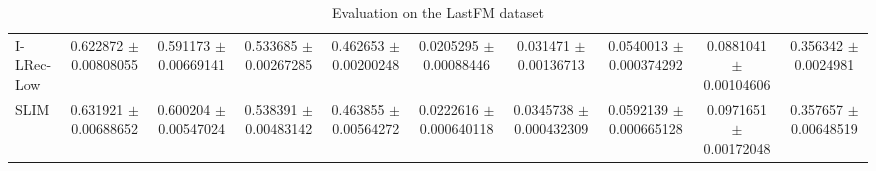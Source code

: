 \begin{table*}
{\begin{tabular}{l|cccc|cccc|c}
		I-LRec-Low & \num{0.622872} $\pm$ \num{0.00808055}&\num{0.591173} $\pm$ \num{0.00669141}&\num{0.533685} $\pm$ \num{0.00267285}&\num{0.462653} $\pm$ \num{0.00200248}&\num{0.0205295} $\pm$ \num{0.00088446}&\num{0.031471} $\pm$ \num{0.00136713}&\num{0.0540013} $\pm$ \num{0.000374292}&\num{0.0881041} $\pm$ \num{0.00104606}&\num{0.356342} $\pm$ \num{0.0024981} \\

		SLIM & \num{0.631921} $\pm$ \num{0.00688652}&\num{0.600204} $\pm$ \num{0.00547024}&\num{0.538391} $\pm$ \num{0.00483142}&\num{0.463855} $\pm$ \num{0.00564272}&\num{0.0222616} $\pm$ \num{0.000640118}&\num{0.0345738} $\pm$ \num{0.000432309}&\num{0.0592139} $\pm$ \num{0.000665128}&\num{0.0971651} $\pm$ \num{0.00172048}&\num{0.357657} $\pm$ \num{0.00648519}\\


	\end{tabular}
}
	\caption{Evaluation on the LastFM dataset}
\end{table*}


